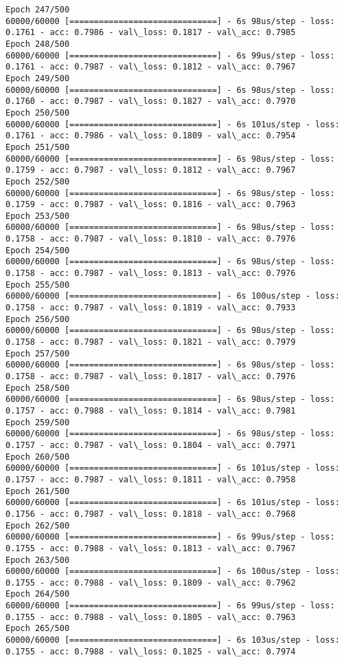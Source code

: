 \documentclass[11pt]{article}
\begin{document}
\begin{Verbatim}[commandchars=\\\{\}]
Epoch 247/500
60000/60000 [==============================] - 6s 98us/step - loss: 0.1761 - acc: 0.7986 - val\_loss: 0.1817 - val\_acc: 0.7985
Epoch 248/500
60000/60000 [==============================] - 6s 99us/step - loss: 0.1761 - acc: 0.7987 - val\_loss: 0.1812 - val\_acc: 0.7967
Epoch 249/500
60000/60000 [==============================] - 6s 98us/step - loss: 0.1760 - acc: 0.7987 - val\_loss: 0.1827 - val\_acc: 0.7970
Epoch 250/500
60000/60000 [==============================] - 6s 101us/step - loss: 0.1761 - acc: 0.7986 - val\_loss: 0.1809 - val\_acc: 0.7954
Epoch 251/500
60000/60000 [==============================] - 6s 98us/step - loss: 0.1759 - acc: 0.7987 - val\_loss: 0.1812 - val\_acc: 0.7967
Epoch 252/500
60000/60000 [==============================] - 6s 98us/step - loss: 0.1759 - acc: 0.7987 - val\_loss: 0.1816 - val\_acc: 0.7963
Epoch 253/500
60000/60000 [==============================] - 6s 98us/step - loss: 0.1758 - acc: 0.7987 - val\_loss: 0.1810 - val\_acc: 0.7976
Epoch 254/500
60000/60000 [==============================] - 6s 98us/step - loss: 0.1758 - acc: 0.7987 - val\_loss: 0.1813 - val\_acc: 0.7976
Epoch 255/500
60000/60000 [==============================] - 6s 100us/step - loss: 0.1758 - acc: 0.7987 - val\_loss: 0.1819 - val\_acc: 0.7933
Epoch 256/500
60000/60000 [==============================] - 6s 98us/step - loss: 0.1758 - acc: 0.7987 - val\_loss: 0.1821 - val\_acc: 0.7979
Epoch 257/500
60000/60000 [==============================] - 6s 98us/step - loss: 0.1758 - acc: 0.7987 - val\_loss: 0.1817 - val\_acc: 0.7976
Epoch 258/500
60000/60000 [==============================] - 6s 98us/step - loss: 0.1757 - acc: 0.7988 - val\_loss: 0.1814 - val\_acc: 0.7981
Epoch 259/500
60000/60000 [==============================] - 6s 98us/step - loss: 0.1757 - acc: 0.7987 - val\_loss: 0.1804 - val\_acc: 0.7971
Epoch 260/500
60000/60000 [==============================] - 6s 101us/step - loss: 0.1757 - acc: 0.7987 - val\_loss: 0.1811 - val\_acc: 0.7958
Epoch 261/500
60000/60000 [==============================] - 6s 101us/step - loss: 0.1756 - acc: 0.7987 - val\_loss: 0.1818 - val\_acc: 0.7968
Epoch 262/500
60000/60000 [==============================] - 6s 99us/step - loss: 0.1755 - acc: 0.7988 - val\_loss: 0.1813 - val\_acc: 0.7967
Epoch 263/500
60000/60000 [==============================] - 6s 100us/step - loss: 0.1755 - acc: 0.7988 - val\_loss: 0.1809 - val\_acc: 0.7962
Epoch 264/500
60000/60000 [==============================] - 6s 99us/step - loss: 0.1755 - acc: 0.7988 - val\_loss: 0.1805 - val\_acc: 0.7963
Epoch 265/500
60000/60000 [==============================] - 6s 103us/step - loss: 0.1755 - acc: 0.7988 - val\_loss: 0.1825 - val\_acc: 0.7974

\end{Verbatim}
\end{document}
